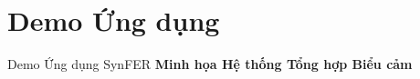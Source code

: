 \section{Demo Ứng dụng}
\begin{frame}{Demo Ứng dụng SynFER}
    \centering
    \Large \textbf{Minh họa Hệ thống Tổng hợp Biểu cảm}
\end{frame}
